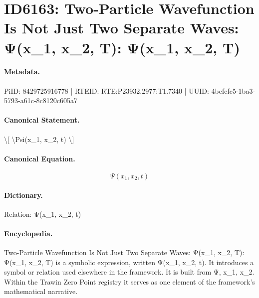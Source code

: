 \section*{ID6163: Two-Particle Wavefunction Is Not Just Two Separate Waves: Ψ(x\_1, x\_2, T): Ψ(x\_1, x\_2, T)}
\paragraph{Metadata.}
PiID: 8429725916778 | RTEID: RTE:P23932.2977:T1.7340 | UUID: 4befcfc5-1ba3-5793-a61c-8c8120c605a7

\paragraph{Canonical Statement.}
\textbackslash{}[ \textbackslash{}Psi(x\_1, x\_2, t) \textbackslash{}]

\paragraph{Canonical Equation.}
\[
\Psi(x_1, x_2, t)
\]

\paragraph{Dictionary.}
Relation: Ψ(x\_1, x\_2, t)

\paragraph{Encyclopedia.}
Two-Particle Wavefunction Is Not Just Two Separate Waves: Ψ(x\_1, x\_2, T): Ψ(x\_1, x\_2, T) is a symbolic expression, written Ψ(x\_1, x\_2, t). It introduces a symbol or relation used elsewhere in the framework. It is built from Ψ, x\_1, x\_2. Within the Trawin Zero Point registry it serves as one element of the framework's mathematical narrative.
